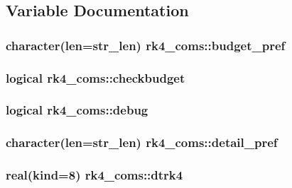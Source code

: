 \subsection{Variable Documentation}
\subsubsection[{\texorpdfstring{budget\+\_\+pref}{budget_pref}}]{\setlength{\rightskip}{0pt plus 5cm}character(len=str\+\_\+len) rk4\+\_\+coms\+::budget\+\_\+pref}\hypertarget{namespacerk4__coms_a2da1f732b9648b485c93d62814060cf2}{}\label{namespacerk4__coms_a2da1f732b9648b485c93d62814060cf2}
\subsubsection[{\texorpdfstring{checkbudget}{checkbudget}}]{\setlength{\rightskip}{0pt plus 5cm}logical rk4\+\_\+coms\+::checkbudget}\hypertarget{namespacerk4__coms_a9b8354d59e352fedb78f49d2195a9d7a}{}\label{namespacerk4__coms_a9b8354d59e352fedb78f49d2195a9d7a}
\subsubsection[{\texorpdfstring{debug}{debug}}]{\setlength{\rightskip}{0pt plus 5cm}logical rk4\+\_\+coms\+::debug}\hypertarget{namespacerk4__coms_a5abb49d2a6e86524f3c3bf3f67468c21}{}\label{namespacerk4__coms_a5abb49d2a6e86524f3c3bf3f67468c21}
\subsubsection[{\texorpdfstring{detail\+\_\+pref}{detail_pref}}]{\setlength{\rightskip}{0pt plus 5cm}character(len=str\+\_\+len) rk4\+\_\+coms\+::detail\+\_\+pref}\hypertarget{namespacerk4__coms_acd58047348a9b1ff25ec1afda9163705}{}\label{namespacerk4__coms_acd58047348a9b1ff25ec1afda9163705}
\subsubsection[{\texorpdfstring{dtrk4}{dtrk4}}]{\setlength{\rightskip}{0pt plus 5cm}real(kind=8) rk4\+\_\+coms\+::dtrk4}\hypertarget{namespacerk4__coms_affa4e03ec127e7def8035b8b32bdb5b8}{}\label{namespacerk4__coms_affa4e03ec127e7def8035b8b32bdb5b8}
